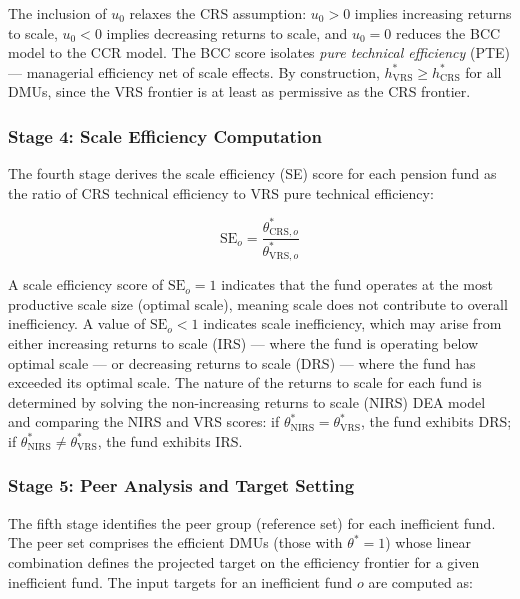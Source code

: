 \documentclass[12pt,a4paper]{article}
\begin{document}
The inclusion of $u_0$ relaxes the CRS assumption: $u_0 > 0$ implies increasing returns to scale, $u_0 < 0$ implies decreasing returns to scale, and $u_0 = 0$ reduces the BCC model to the CCR model. The BCC score isolates \textit{pure technical efficiency} (PTE) --- managerial efficiency net of scale effects. By construction, $h^*_{\text{VRS}} \geq h^*_{\text{CRS}}$ for all DMUs, since the VRS frontier is at least as permissive as the CRS frontier.

\subsubsection{Stage 4: Scale Efficiency Computation}

The fourth stage derives the scale efficiency (SE) score for each pension fund as the ratio of CRS technical efficiency to VRS pure technical efficiency:

\begin{equation}
\text{SE}_o = \frac{\theta^*_{\text{CRS},o}}{\theta^*_{\text{VRS},o}}
\end{equation}

A scale efficiency score of $\text{SE}_o = 1$ indicates that the fund operates at the most productive scale size (optimal scale), meaning scale does not contribute to overall inefficiency. A value of $\text{SE}_o < 1$ indicates scale inefficiency, which may arise from either increasing returns to scale (IRS) --- where the fund is operating below optimal scale --- or decreasing returns to scale (DRS) --- where the fund has exceeded its optimal scale. The nature of the returns to scale for each fund is determined by solving the non-increasing returns to scale (NIRS) DEA model and comparing the NIRS and VRS scores: if $\theta^*_{\text{NIRS}} = \theta^*_{\text{VRS}}$, the fund exhibits DRS; if $\theta^*_{\text{NIRS}} \neq \theta^*_{\text{VRS}}$, the fund exhibits IRS.

\subsubsection{Stage 5: Peer Analysis and Target Setting}

The fifth stage identifies the peer group (reference set) for each inefficient fund. The peer set comprises the efficient DMUs (those with $\theta^* = 1$) whose linear combination defines the projected target on the efficiency frontier for a given inefficient fund. The input targets for an inefficient fund $o$ are computed as:
\end{document}
